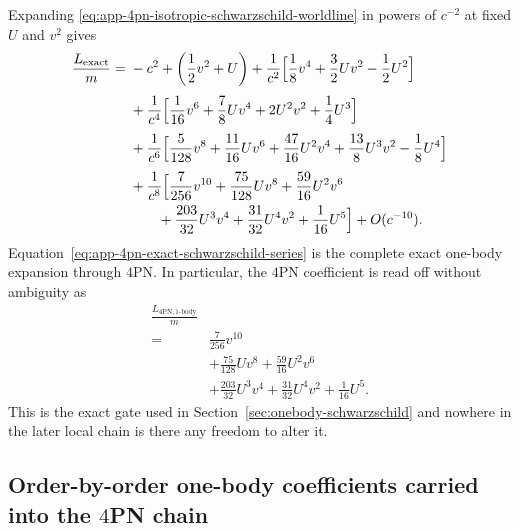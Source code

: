 \documentclass[11pt]{article}
\begin{document}
Expanding
\eqref{eq:app-4pn-isotropic-schwarzschild-worldline} in powers of $c^{-2}$ at
fixed $U$ and $v^2$ gives
\begin{equation}
\begin{split}
\frac{L_{\rm exact}}{m}
={}&
-c^2
+\left(\frac12 v^2+U\right)
+\frac{1}{c^2}\Bigl[
\frac18 v^4
+\frac32 Uv^2
-\frac12 U^2
\Bigr]
\\[0.75ex]
&+\frac{1}{c^4}\Bigl[
\frac1{16}v^6
+\frac78 Uv^4
+2U^2v^2
+\frac14 U^3
\Bigr]
\\[0.75ex]
&+\frac{1}{c^6}\Bigl[
\frac5{128}v^8
+\frac{11}{16}Uv^6
+\frac{47}{16}U^2v^4
+\frac{13}{8}U^3v^2
-\frac18 U^4
\Bigr]
\\[0.75ex]
&+\frac{1}{c^8}\Bigl[
\frac7{256}v^{10}
+\frac{75}{128}Uv^8
+\frac{59}{16}U^2v^6
\\
&\hspace{2em}
+\frac{203}{32}U^3v^4
+\frac{31}{32}U^4v^2
+\frac1{16}U^5
\Bigr]
+O(c^{-10}).
\end{split}
\label{eq:app-4pn-exact-schwarzschild-series}
\end{equation}
Equation~\eqref{eq:app-4pn-exact-schwarzschild-series} is the complete exact
one-body expansion through $4$PN.  In particular, the $4$PN coefficient is read
off without ambiguity as
\begin{equation}
\begin{aligned}
\frac{L_{4\mathrm{PN},1\text{-body}}}{m}
\\
={}&
\frac7{256}v^{10}
\\
&+
\frac{75}{128}Uv^8
+\frac{59}{16}U^2v^6
\\
&+
\frac{203}{32}U^3v^4
+\frac{31}{32}U^4v^2
+\frac1{16}U^5.
\end{aligned}
\label{eq:app-4pn-onebody-coefficient}
\end{equation}
This is the exact gate used in
Section~\ref{sec:onebody-schwarzschild} and nowhere in the later local chain is
there any freedom to alter it.

\subsection{Order-by-order one-body coefficients carried into the \texorpdfstring{$4$}{4}PN chain}
\label{app:onebody-expansion-orders}
\end{document}
